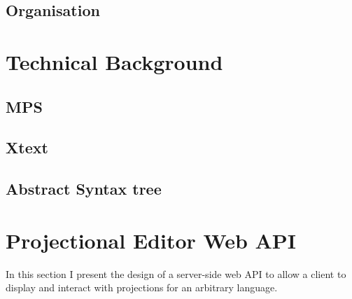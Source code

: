 \documentclass{report}
\begin{document}
\subsection{Organisation} 
\section{Technical Background}
\subsection{MPS}
\subsection{Xtext}
\subsection{Abstract Syntax tree}
%

\section{Projectional Editor Web API}
In this section I present the design of a server-side web API to allow a client to display and interact with projections for an arbitrary language. 
\end{document}
